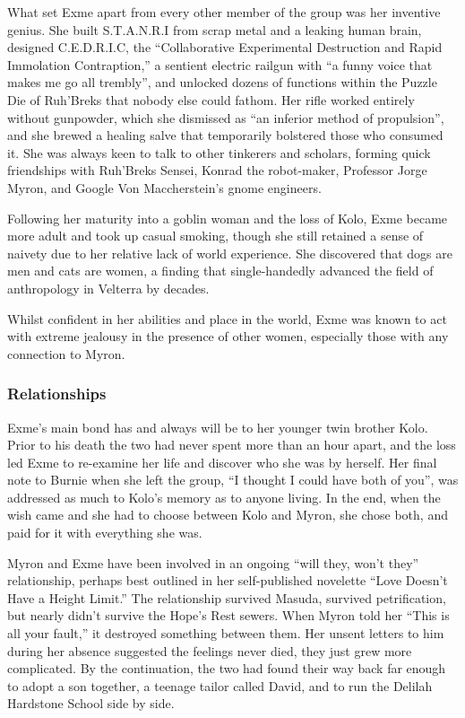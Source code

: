 What set Exme apart from every other member of the group was her inventive genius.  She built S.T.A.N.R.I from scrap metal and a leaking human brain, designed C.E.D.R.I.C, the ``Collaborative Experimental Destruction and Rapid Immolation Contraption,'' a sentient electric railgun with ``a funny voice that makes me go all trembly'', and unlocked dozens of functions within the Puzzle Die of Ruh'Breks that nobody else could fathom.  Her rifle worked entirely without gunpowder, which she dismissed as ``an inferior method of propulsion'', and she brewed a healing salve that temporarily bolstered those who consumed it.  She was always keen to talk to other tinkerers and scholars, forming quick friendships with Ruh'Breks Sensei, Konrad the robot-maker, Professor Jorge Myron, and Google Von Maccherstein's gnome engineers.

Following her maturity into a goblin woman and the loss of Kolo, Exme became more adult and took up casual smoking, though she still retained a sense of naivety due to her relative lack of world experience.  She discovered that dogs are men and cats are women, a finding that single-handedly advanced the field of anthropology in Velterra by decades.

Whilst confident in her abilities and place in the world, Exme was known to act with extreme jealousy in the presence of other women, especially those with any connection to Myron.  

\subsubsection{Relationships}

Exme's main bond has and always will be to her younger twin brother Kolo.  Prior to his death the two had never spent more than an hour apart, and the loss led Exme to re-examine her life and discover who she was by herself.  Her final note to Burnie when she left the group, ``I thought I could have both of you'', was addressed as much to Kolo's memory as to anyone living.  In the end, when the wish came and she had to choose between Kolo and Myron, she chose both, and paid for it with everything she was.

Myron and Exme have been involved in an ongoing ``will they, won't they'' relationship, perhaps best outlined in her self-published novelette ``Love Doesn't Have a Height Limit.''  The relationship survived Masuda, survived petrification, but nearly didn't survive the Hope's Rest sewers.  When Myron told her ``This is all your fault,'' it destroyed something between them.  Her unsent letters to him during her absence suggested the feelings never died, they just grew more complicated.  By the continuation, the two had found their way back far enough to adopt a son together, a teenage tailor called David, and to run the Delilah Hardstone School side by side.

